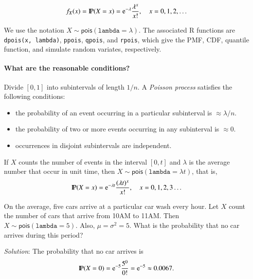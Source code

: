 \documentclass[captions=tableheading]{scrbook}
\begin{document}
\begin{equation}
f_{X}(x)=\mathrm{I\hspace{-1.5pt}P}(X=x)=\mathrm{e}^{-\lambda}\frac{\lambda^{x}}{x!},\quad x=0,1,2,\ldots
\end{equation}

We use the notation \(X\sim\mathsf{pois}(\mathtt{lambda}=\lambda)\). The associated \textsf{R} functions are \texttt{dpois(x, lambda)}, \texttt{ppois}, \texttt{qpois}, and \texttt{rpois}, which give the PMF, CDF, quantile function, and simulate random variates, respectively.


\paragraph*{What are the reasonable conditions?}

Divide \([0,1]\) into subintervals of length \(1/n\). A \emph{Poisson process} satisfies the following conditions:

\begin{itemize}
\item the probability of an event occurring in a particular subinterval is \(\approx\lambda/n\).
\item the probability of two or more events occurring in any subinterval is \(\approx 0\).
\item occurrences in disjoint subintervals are independent.
\end{itemize}

\begin{rem}
\label{rem:poisson-process}

If \(X\) counts the number of events in the interval \([0,t]\) and \(\lambda\) is the average number that occur in unit time, then \(X\sim\mathsf{pois}(\mathtt{lambda}=\lambda t)\), that is,
\begin{equation}
\mathrm{I\hspace{-1.5pt}P}(X=x)=\mathrm{e}^{-\lambda t}\frac{(\lambda t)^{x}}{x!},\quad x=0,1,2,3\ldots
\end{equation}
\end{rem}

\begin{example}
On the average, five cars arrive at a particular car wash every hour. Let \(X\) count the number of cars that arrive from 10AM to 11AM. Then \(X\sim\mathsf{pois}(\mathtt{lambda}=5)\). Also, \(\mu=\sigma^{2}=5\). What is the probability that no car arrives during this period? 

\emph{Solution}: The probability that no car arrives is
\[
\mathrm{I\hspace{-1.5pt}P}(X=0)=\mathrm{e}^{-5}\frac{5^{0}}{0!}=\mathrm{e}^{-5}\approx0.0067.
\]

\end{example}
\end{document}
